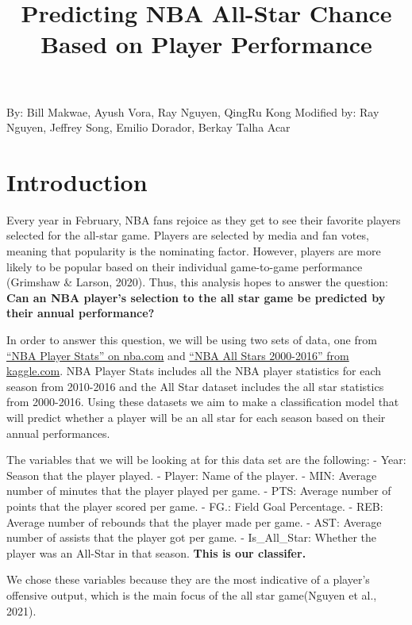 \documentclass[
]{article}
\title{Predicting NBA All-Star Chance Based on Player Performance}
\author{}
\date{\vspace{-2.5em}}
\begin{document}
\maketitle

{
\setcounter{tocdepth}{2}
\tableofcontents
}
By: Bill Makwae, Ayush Vora, Ray Nguyen, QingRu Kong
Modified by: Ray Nguyen, Jeffrey Song, Emilio Dorador, Berkay Talha Acar

\hypertarget{introduction}{%
\section{Introduction}\label{introduction}}

Every year in February, NBA fans rejoice as they get to see their favorite players selected for the all-star game. Players are selected by media and fan votes, meaning that popularity is the nominating factor. However, players are more likely to be popular based on their individual game-to-game performance (Grimshaw \& Larson, 2020). Thus, this analysis hopes to answer the question: \textbf{Can an NBA player's selection to the all star game be predicted by their annual performance?}

In order to answer this question, we will be using two sets of data, one from \href{https://www.nba.com/stats/players/traditional/?sort=PTS\&dir=-1\&Season=2015-16\&SeasonType=Regular\%20Season}{``NBA Player Stats'' on nba.com} and \href{https://www.kaggle.com/fmejia21/nba-all-star-game-20002016?select=NBA+All+Stars+2000-2016+-+Sheet1.csv}{``NBA All Stars 2000-2016'' from kaggle.com}. NBA Player Stats includes all the NBA player statistics for each season from 2010-2016 and the All Star dataset includes the all star statistics from 2000-2016. Using these datasets we aim to make a classification model that will predict whether a player will be an all star for each season based on their annual performances.

The variables that we will be looking at for this data set are the following:
- Year: Season that the player played.
- Player: Name of the player.
- MIN: Average number of minutes that the player played per game.
- PTS: Average number of points that the player scored per game.
- FG.: Field Goal Percentage.
- REB: Average number of rebounds that the player made per game.
- AST: Average number of assists that the player got per game.
- Is\_All\_Star: Whether the player was an All-Star in that season.
\textbf{This is our classifer.}

We chose these variables because they are the most indicative of a player's offensive output, which is the main focus of the all star game(Nguyen et al., 2021).
\end{document}
